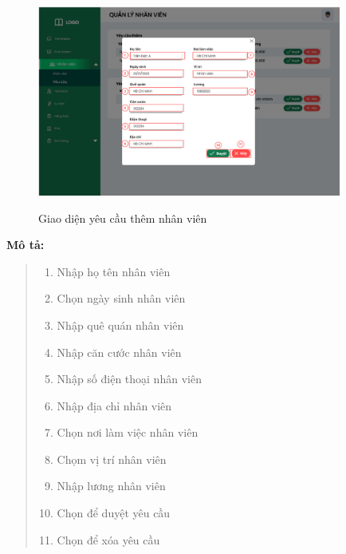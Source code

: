             \begin{figure}[!htp]
                \centering
                \includegraphics[width=10cm]{img/UI/admin/staff_request_add.png}
                \label{27}
                \newline
                \caption{Giao diện yêu cầu thêm nhân viên}
            \end{figure}
            \textbf{Mô tả:}  
            \begin{quote}
                \begin{enumerate}
                    \item Nhập họ tên nhân viên
                    \item Chọn ngày sinh nhân viên
                    \item Nhập quê quán nhân viên
                    \item Nhập căn cước nhân viên
                    \item Nhập số điện thoại nhân viên
                    \item Nhập địa chỉ nhân viên
                    \item Chọn nơi làm việc nhân viên
                    \item Chọm vị trí nhân viên
                    \item Nhập lương nhân viên
                    \item Chọn để duyệt yêu cầu
                    \item Chọn để xóa yêu cầu
                \end{enumerate}
            \end{quote}
        
